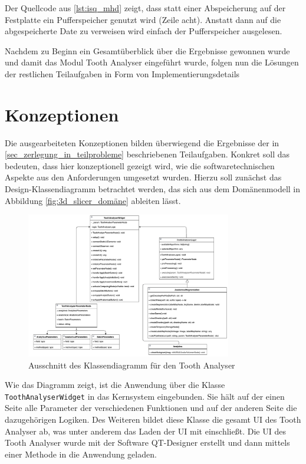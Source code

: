 Der Quellcode aus \ref{lst:isq_mhd} zeigt, dass statt einer Abspeicherung auf
der Festplatte ein Pufferspeicher genutzt wird (Zeile acht). Anstatt dann auf die
abgespeicherte Date zu verweisen wird einfach der Pufferspeicher ausgelesen.

Nachdem zu Beginn ein Gesamtüberblick über die Ergebnisse gewonnen wurde und damit
das Modul Tooth Analyser eingeführt wurde, folgen nun die Lösungen der
restlichen Teilaufgaben in Form von Implementierungsdetails

\pagebreak

\section{Konzeptionen}
\label{sec:konzeptionen} Die ausgearbeiteten Konzeptionen bilden überwiegend die
Ergebnisse der in \ref{sec_zerlegung_in_teilprobleme} beschriebenen Teilaufgaben.
Konkret soll das bedeuten, dass hier konzeptionell gezeigt wird, wie die softwaretechnischen
Aspekte aus den Anforderungen umgesetzt wurden. Hierzu soll zunächst das Design-Klassendiagramm
betrachtet werden, das sich aus dem Domänenmodell in Abbildung \ref{fig:3d_slicer_domäne}
ableiten lässt.

\begin{figure}[h]
	\centering
	\includegraphics[width=0.8\textwidth]{img/toothAnalyserClasses.png}
	\caption{Ausschnitt des Klassendiagramm für den Tooth Analyser}
	\label{fig:klassendiagramm}
\end{figure}

Wie das Diagramm zeigt, ist die Anwendung über die Klasse \texttt{ToothAnalyserWidget}
in das Kernsystem eingebunden. Sie hält auf der einen Seite alle Parameter der verschiedenen
Funktionen und auf der anderen Seite die dazugehörigen Logiken. Des Weiteren
bildet diese Klasse die gesamt UI des Tooth Analyser ab, was unter anderem das Laden
der \ac{UI} mit einschließt. Die UI des Tooth Analyser wurde mit der Software QT-Designer
erstellt und dann mittels einer Methode in die Anwendung geladen.

